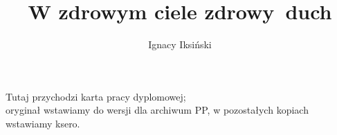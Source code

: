 \documentclass[polish,a4paper,oneside]{ppfcmthesis}
\author{Ignacy Iksiński}                              %
\title{W zdrowym ciele zdrowy~duch}                   %
\begin{document}
\frontmatter\pagestyle{empty}%
\maketitle\cleardoublepage%

\thispagestyle{empty}\vspace*{\fill}%
\begin{center}Tutaj przychodzi karta pracy dyplomowej;\\oryginał wstawiamy do wersji dla archiwum PP, w pozostałych kopiach wstawiamy ksero.\end{center}%
\vfill\cleardoublepage%

\pagestyle{ppfcmthesis}%
\tableofcontents* \cleardoublepage%

\mainmatter%





\cleardoublepage\appendix%



{\raggedright\sloppy\small}

\ppcolophon
\end{document}
